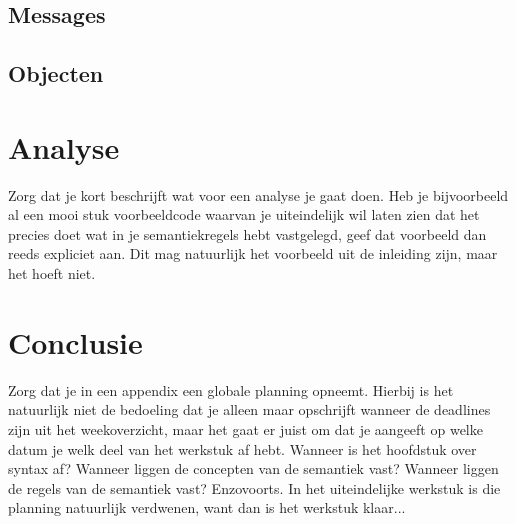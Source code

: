 \documentclass[12pt]{article}
\begin{document}
\subsection{Messages}
\subsection{Objecten}

\section{Analyse}
Zorg dat je kort beschrijft wat voor een analyse je gaat doen. Heb je bijvoorbeeld al een mooi stuk voorbeeldcode waarvan je uiteindelijk wil laten zien dat het precies doet wat in je semantiekregels hebt vastgelegd, geef dat voorbeeld dan reeds expliciet aan. Dit mag natuurlijk het voorbeeld uit de inleiding zijn, maar het hoeft niet.

\section{Conclusie}

\appendix
Zorg dat je in een appendix een globale planning opneemt. Hierbij is het natuurlijk niet de bedoeling dat je alleen maar opschrijft wanneer de deadlines zijn uit het weekoverzicht, maar het gaat er juist om dat je aangeeft op welke datum je welk deel van het werkstuk af hebt. Wanneer is het hoofdstuk over syntax af? Wanneer liggen de concepten van de semantiek vast? Wanneer liggen de regels van de semantiek vast? Enzovoorts. In het uiteindelijke werkstuk is die planning natuurlijk verdwenen, want dan is het werkstuk klaar...
\end{document}
